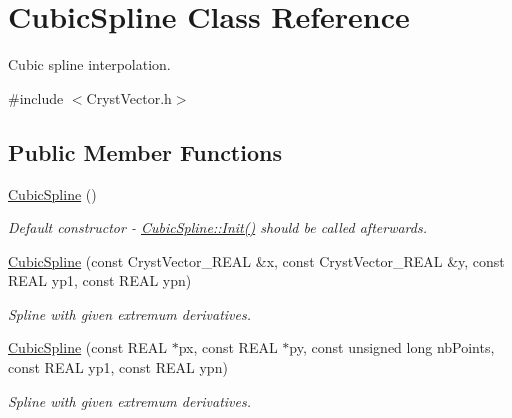 \hypertarget{class_cubic_spline}{}\section{Cubic\+Spline Class Reference}
\label{class_cubic_spline}


Cubic spline interpolation.  




{\ttfamily \#include $<$Cryst\+Vector.\+h$>$}

\subsection*{Public Member Functions}
\begin{DoxyCompactItemize}
\item 
\mbox{\label{class_cubic_spline_a3eee74ae159c9473a6d15512ddc68d25}} 
\mbox{\hyperlink{class_cubic_spline_a3eee74ae159c9473a6d15512ddc68d25}{Cubic\+Spline}} ()
\begin{DoxyCompactList}\small\item\em Default constructor -\/ \mbox{\hyperlink{class_cubic_spline_a2a9501b0f12aafa8f7cd3c3c4e842a91}{Cubic\+Spline\+::\+Init()}} should be called afterwards. \end{DoxyCompactList}\item 
\mbox{\label{class_cubic_spline_a2f6cf405f4b630e857225ce16a34efe2}} 
\mbox{\hyperlink{class_cubic_spline_a2f6cf405f4b630e857225ce16a34efe2}{Cubic\+Spline}} (const Cryst\+Vector\+\_\+\+R\+E\+AL \&x, const Cryst\+Vector\+\_\+\+R\+E\+AL \&y, const R\+E\+AL yp1, const R\+E\+AL ypn)
\begin{DoxyCompactList}\small\item\em Spline with given extremum derivatives. \end{DoxyCompactList}\item 
\mbox{\label{class_cubic_spline_a2f1c6e1d34287f8581a7dad044afa62c}} 
\mbox{\hyperlink{class_cubic_spline_a2f1c6e1d34287f8581a7dad044afa62c}{Cubic\+Spline}} (const R\+E\+AL $\ast$px, const R\+E\+AL $\ast$py, const unsigned long nb\+Points, const R\+E\+AL yp1, const R\+E\+AL ypn)
\begin{DoxyCompactList}\small\item\em Spline with given extremum derivatives. \end{DoxyCompactList}\item 

\end{DoxyCompactItemize}
